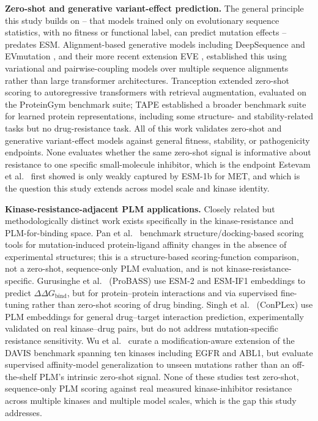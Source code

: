 \documentclass[pdflatex,sn-mathphys-num]{sn-jnl}%
\theoremstyle{thmstyleone}%
\theoremstyle{thmstyletwo}%
\theoremstyle{thmstylethree}%
\begin{document}
\textbf{Zero-shot and generative variant-effect prediction.} The general principle this study builds on -- that models trained only on evolutionary sequence statistics, with no fitness or functional label, can predict mutation effects -- predates ESM. Alignment-based generative models including DeepSequence \citep{Riesselman2018} and EVmutation \citep{Hopf2017}, and their more recent extension EVE \citep{Frazer2021}, established this using variational and pairwise-coupling models over multiple sequence alignments rather than large transformer architectures. Tranception \citep{Notin2022} extended zero-shot scoring to autoregressive transformers with retrieval augmentation, evaluated on the ProteinGym benchmark suite; TAPE \citep{Rao2019} established a broader benchmark suite for learned protein representations, including some structure- and stability-related tasks but no drug-resistance task. All of this work validates zero-shot and generative variant-effect models against general fitness, stability, or pathogenicity endpoints. None evaluates whether the same zero-shot signal is informative about resistance to one specific small-molecule inhibitor, which is the endpoint Estevam et al.\ \citep{Estevam2025} first showed is only weakly captured by ESM-1b for MET, and which is the question this study extends across model scale and kinase identity.

\textbf{Kinase-resistance-adjacent PLM applications.} Closely related but methodologically distinct work exists specifically in the kinase-resistance and PLM-for-binding space. Pan et al.\ \citep{Pan2026} benchmark structure/docking-based scoring tools for mutation-induced protein-ligand affinity changes in the absence of experimental structures; this is a structure-based scoring-function comparison, not a zero-shot, sequence-only PLM evaluation, and is not kinase-resistance-specific. Gurusinghe et al.\ \citep{Gurusinghe2025} (ProBASS) use ESM-2 and ESM-IF1 embeddings to predict $\Delta\Delta G_{\text{bind}}$, but for protein--protein interactions and via supervised fine-tuning rather than zero-shot scoring of drug binding. Singh et al.\ \citep{Singh2023} (ConPLex) use PLM embeddings for general drug--target interaction prediction, experimentally validated on real kinase--drug pairs, but do not address mutation-specific resistance sensitivity. Wu et al.\ \citep{Wu2025} curate a modification-aware extension of the DAVIS benchmark spanning ten kinases including EGFR and ABL1, but evaluate supervised affinity-model generalization to unseen mutations rather than an off-the-shelf PLM's intrinsic zero-shot signal. None of these studies test zero-shot, sequence-only PLM scoring against real measured kinase-inhibitor resistance across multiple kinases and multiple model scales, which is the gap this study addresses.
\end{document}
